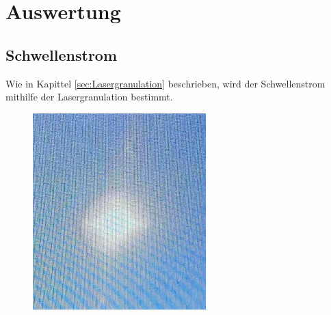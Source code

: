 \section{Auswertung}
\label{sec:Auswertung}
\subsection{Schwellenstrom}
Wie in Kapittel \ref{sec:Lasergranulation} beschrieben,
wird der Schwellenstrom mithilfe der Lasergranulation bestimmt.
\begin{figure}[h]
    \centering
    \begin{minipage}[t]{0.45\textwidth}
        \centering
        \includegraphics[width=1\linewidth]{abb/LED.jpeg}
    \end{minipage}
    \begin{minipage}[t]{0.45\textwidth}
        \centering

\end{minipage}
\end{figure}
